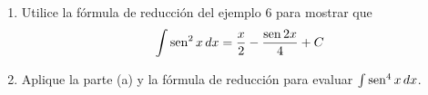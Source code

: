 \item 
    \begin{enumerate}
        \item[(a)] Utilice la fórmula de reducción del ejemplo 6 para mostrar que
        \[ \int \operatorname{sen}^2 x \, dx = \frac{x}{2} - \frac{\operatorname{sen} 2x}{4} + C \]
        \item[(b)] Aplique la parte (a) y la fórmula de reducción para evaluar $\int \operatorname{sen}^4 x \, dx$.
    \end{enumerate}
